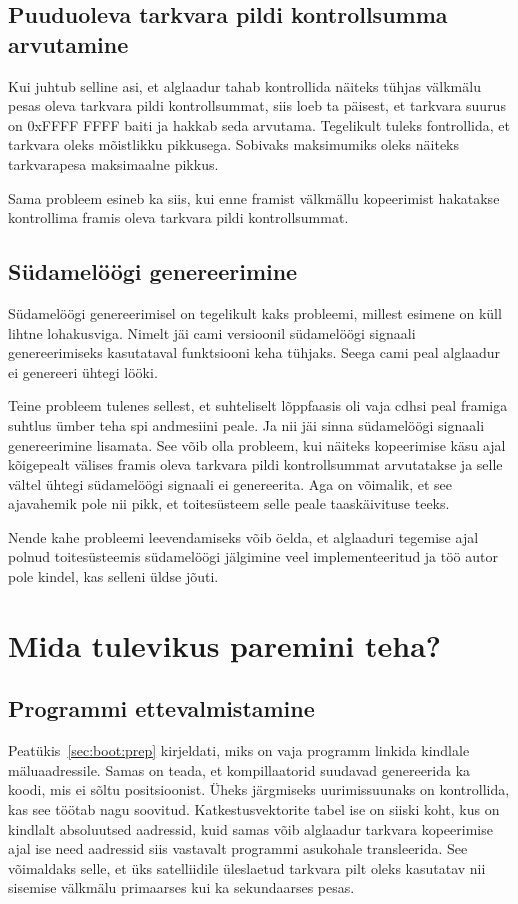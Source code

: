 \documentclass[12pt,a4paper]{article}
\begin{document}
\subsection{Puuduoleva tarkvara pildi kontrollsumma arvutamine}
Kui juhtub selline asi, et alglaadur tahab kontrollida näiteks tühjas välkmälu
pesas oleva tarkvara pildi kontrollsummat, siis loeb ta päisest, et tarkvara
suurus on 0xFFFF FFFF baiti ja hakkab seda arvutama. Tegelikult tuleks
fontrollida, et tarkvara oleks mõistlikku pikkusega. Sobivaks maksimumiks oleks
näiteks tarkvarapesa maksimaalne pikkus.

Sama probleem esineb ka siis, kui enne \gls{fram}ist välkmällu kopeerimist hakatakse
kontrollima \gls{fram}is oleva tarkvara pildi kontrollsummat.

\subsection{Südamelöögi genereerimine}
Südamelöögi genereerimisel on tegelikult kaks probleemi, millest esimene on küll
lihtne lohakusviga. Nimelt jäi \gls{cam}i versioonil südamelöögi signaali
genereerimiseks kasutataval funktsiooni keha tühjaks. Seega \gls{cam}i peal alglaadur
ei genereeri ühtegi lööki.

Teine probleem tulenes sellest, et suhteliselt lõppfaasis oli vaja \gls{cdhs}i peal \gls{fram}iga
suhtlus ümber teha \gls{spi} andmesiini peale. Ja nii jäi sinna südamelöögi signaali
genereerimine lisamata. See võib olla probleem, kui näiteks kopeerimise käsu
ajal kõigepealt välises \gls{fram}is oleva tarkvara pildi kontrollsummat arvutatakse
ja selle vältel ühtegi südamelöögi signaali ei genereerita. Aga on võimalik, et
see ajavahemik pole nii pikk, et toitesüsteem selle peale taaskäivituse teeks.

Nende kahe probleemi leevendamiseks võib öelda, et alglaaduri tegemise ajal
polnud toitesüsteemis südamelöögi jälgimine veel implementeeritud ja töö autor
pole kindel, kas selleni üldse jõuti.

\label{sec:prob:beat}
\section{Mida tulevikus paremini teha?}
\subsection{Programmi ettevalmistamine}
Peatükis~\ref{sec:boot:prep} kirjeldati, miks on vaja programm linkida kindlale
mäluaadressile. Samas on teada, et kompillaatorid suudavad genereerida ka koodi,
mis ei sõltu positsioonist. Üheks järgmiseks uurimissuunaks on kontrollida, kas
see töötab nagu soovitud. Katkestusvektorite tabel ise on siiski koht, kus on
kindlalt absoluutsed aadressid, kuid samas võib alglaadur tarkvara kopeerimise
ajal ise need aadressid siis vastavalt programmi asukohale transleerida. See
võimaldaks selle, et üks satelliidile üleslaetud tarkvara pilt oleks kasutatav
nii sisemise välkmälu primaarses kui ka sekundaarses pesas.
\end{document}
